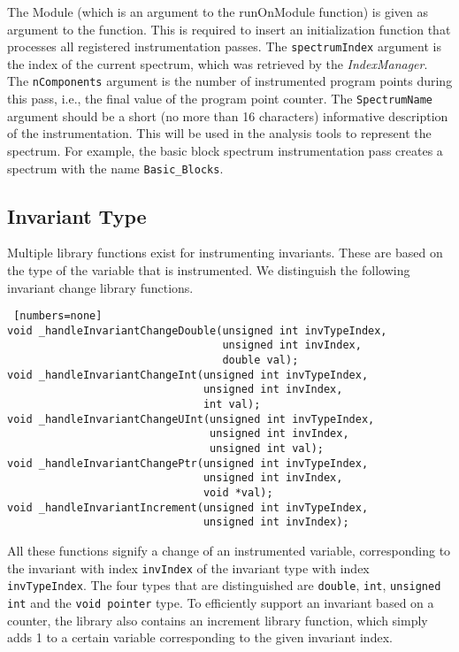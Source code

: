 The Module (which is an argument to the runOnModule function) 
is given as argument to the function.
This is required to insert an initialization function that 
processes all registered instrumentation passes.
The \verb|spectrumIndex| argument is the index of the current
spectrum, which was retrieved by the \emph{IndexManager}.
The \verb|nComponents| argument is the number of instrumented
program points during this pass, i.e., the final value of the
program point counter.
The \verb|SpectrumName| argument should be a short (no more than 16 characters)
informative description of the instrumentation.
This will be used in the analysis tools to represent the spectrum.
For example, the basic block spectrum instrumentation pass
creates a spectrum with the name \verb|Basic_Blocks|.


\subsection{Invariant Type}
\label{s:appendixInvariantType}

Multiple library functions exist for instrumenting invariants.
These are based on the type of the variable that is instrumented.
We distinguish the following invariant change library functions.
\begin{lstlisting} [numbers=none]
void _handleInvariantChangeDouble(unsigned int invTypeIndex, 
                                  unsigned int invIndex, 
                                  double val);
void _handleInvariantChangeInt(unsigned int invTypeIndex, 
                               unsigned int invIndex, 
                               int val);
void _handleInvariantChangeUInt(unsigned int invTypeIndex, 
                                unsigned int invIndex, 
                                unsigned int val);
void _handleInvariantChangePtr(unsigned int invTypeIndex, 
                               unsigned int invIndex, 
                               void *val);
void _handleInvariantIncrement(unsigned int invTypeIndex, 
                               unsigned int invIndex);
\end{lstlisting}
All these functions signify a change of an instrumented variable,
corresponding to the invariant with index \texttt{invIndex} of the
invariant type with index \verb|invTypeIndex|.
The four types that are distinguished are \texttt{double}, 
\texttt{int}, \texttt{unsigned int} and the \texttt{void pointer} type.
To efficiently support an invariant based on a counter,
the library also contains an increment library function, 
which simply adds 1 to a certain variable corresponding to the given 
invariant index.

